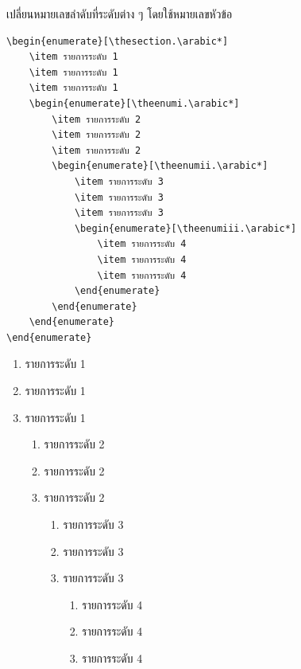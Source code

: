 \begin{exampleBox}[lefthand ratio=0.55,sidebyside]{เปลี่ยนหมายเลขลำดับที่ระดับต่าง ๆ โดยใช้หมายเลขหัวข้อ}
\scriptsize
\begin{lstlisting}[frame=none,language={[LaTeX]TeX}]
\begin{enumerate}[\thesection.\arabic*]
    \item รายการระดับ 1
    \item รายการระดับ 1
    \item รายการระดับ 1
    \begin{enumerate}[\theenumi.\arabic*]
        \item รายการระดับ 2
        \item รายการระดับ 2
        \item รายการระดับ 2
        \begin{enumerate}[\theenumii.\arabic*]
            \item รายการระดับ 3
            \item รายการระดับ 3
            \item รายการระดับ 3
            \begin{enumerate}[\theenumiii.\arabic*]
                \item รายการระดับ 4
                \item รายการระดับ 4
                \item รายการระดับ 4
            \end{enumerate}
        \end{enumerate}
    \end{enumerate}
\end{enumerate}
\end{lstlisting}
\tcblower
\scriptsize
\begin{enumerate}
    \item รายการระดับ 1
    \item รายการระดับ 1
    \item รายการระดับ 1
    \begin{enumerate}
        \item รายการระดับ 2
        \item รายการระดับ 2
        \item รายการระดับ 2
        \begin{enumerate}
            \item รายการระดับ 3
            \item รายการระดับ 3
            \item รายการระดับ 3
            \begin{enumerate}
                \item รายการระดับ 4
                \item รายการระดับ 4
                \item รายการระดับ 4
            \end{enumerate}
        \end{enumerate}
    \end{enumerate}
\end{enumerate}
\end{exampleBox}
\newpage
